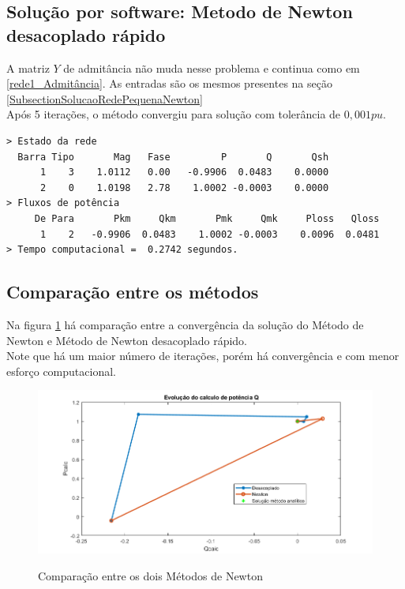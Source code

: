 \subsection{Solução por software: Metodo de Newton desacoplado rápido}
A matriz $Y$ de admitância não muda nesse problema e continua como em \ref{rede1_Admitância}. As entradas são os mesmos presentes na seção \ref{SubsectionSolucaoRedePequenaNewton}\\ 
Após 5 iterações, o método convergiu para solução com tolerância de $0,001pu$. 
\begin{verbatim}
> Estado da rede
  Barra Tipo       Mag   Fase         P       Q       Qsh
      1    3    1.0112   0.00   -0.9906  0.0483    0.0000 
      2    0    1.0198   2.78    1.0002 -0.0003    0.0000 
> Fluxos de potência
     De Para       Pkm     Qkm       Pmk     Qmk     Ploss   Qloss
      1    2   -0.9906  0.0483    1.0002 -0.0003    0.0096  0.0481
> Tempo computacional =  0.2742 segundos.
\end{verbatim}



\subsection{Comparação entre os métodos}
Na figura \ref{FigCompNewtonRedePequena} há comparação entre a convergência da solução do Método de Newton e Método de Newton desacoplado rápido. \\
Note que há um maior número de iterações, porém há convergência e com menor esforço computacional.\\
\begin{figure}[!htb]
\caption{Comparação entre os dois Métodos de Newton}
 \centering %
\includegraphics[width=12cm]{figuras/Pcalc2Compara.png} 
\label{FigCompNewtonRedePequena}
\end{figure}

